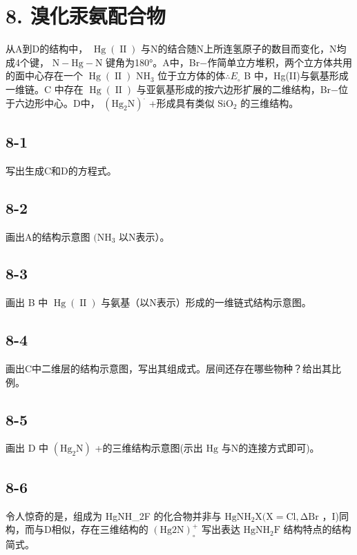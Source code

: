 \section*{8. 溴化汞氨配合物}
从A到D的结构中， $\operatorname { H g } ( \operatorname { I I } )$ 与N的结合随N上所连氢原⼦的数⽬⽽变化，N均成4个键， $\mathrm { N { - } H g { - } N }$ 键⻆为180°。A中，Br−作简单⽴⽅堆积，两个⽴⽅体共⽤的⾯中⼼存在⼀个 $\operatorname { H g } ( \operatorname { I I } )$ $\mathrm { N H _ { 3 } }$ 位于⽴⽅体的体$\therefore E _ { \circ }$ B 中，Hg(II)与氨基形成⼀维链。C 中存在 $\operatorname { H g } ( \operatorname { I I } )$ 与亚氨基形成的按六边形扩展的⼆维结构，Br−位于六边形中⼼。D中， $\mathrm { ( H g _ { 2 } N ) } ^ { . }$ +形成具有类似 $\mathrm { S i O _ { 2 } }$ 的三维结构。

\subsection*{8-1}
写出⽣成C和D的⽅程式。

\subsection*{8-2}
画出A的结构⽰意图 $\mathrm { ( N H _ { 3 } }$ 以N表⽰）。

\subsection*{8-3}
画出 B 中 $\operatorname { H g } ( \operatorname { I I } )$ 与氨基（以N表⽰）形成的⼀维链式结构⽰意图。

\subsection*{8-4}
画出C中⼆维层的结构⽰意图，写出其组成式。层间还存在哪些物种？给出其⽐例。

\subsection*{8-5}
画出 D 中 $\mathrm { ( H g _ { 2 } N ) }$ +的三维结构⽰意图(⽰出 $\mathrm { H g }$ 与N的连接⽅式即可)。

\subsection*{8-6}
令⼈惊奇的是，组成为 HgNH_{2}F 的化合物并⾮与 $\mathrm { { H g N H _ { 2 } X ( X = C l , \Delta \mathrm { { B r } } } }$ ，I)同构，⽽与D相似，存在三维结构的 $\mathrm { ( H g 2 N ) _ { \circ } ^ { + } }$ 写出表达 $\mathrm { H g N H _ { 2 } F }$ 结构特点的结构简式。
